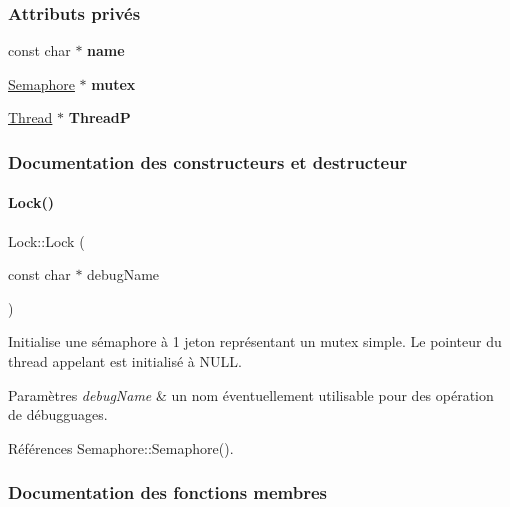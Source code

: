 \subsubsection*{Attributs privés}
\begin{DoxyCompactItemize}
\item 
\hypertarget{class_lock_a4fab518d5af485ba8c0a73e5467904dd}{}\label{class_lock_a4fab518d5af485ba8c0a73e5467904dd} 
const char $\ast$ {\bfseries name}
\item 
\hypertarget{class_lock_a2f6d199f9e3322259aa999aad60a4f54}{}\label{class_lock_a2f6d199f9e3322259aa999aad60a4f54} 
\hyperlink{class_semaphore}{Semaphore} $\ast$ {\bfseries mutex}
\item 
\hypertarget{class_lock_a44b08d70093bc63d221c25b3d3ac1d4a}{}\label{class_lock_a44b08d70093bc63d221c25b3d3ac1d4a} 
\hyperlink{class_thread}{Thread} $\ast$ {\bfseries ThreadP}
\end{DoxyCompactItemize}


\subsubsection{Documentation des constructeurs et destructeur}
\hypertarget{class_lock_afe45a309ecbd6b3346db887a76f0a9cf}{}\label{class_lock_afe45a309ecbd6b3346db887a76f0a9cf} 
\paragraph{\texorpdfstring{Lock()}{Lock()}}
{\footnotesize\ttfamily Lock\+::\+Lock (\begin{DoxyParamCaption}\item[{const char $\ast$}]{debug\+Name }\end{DoxyParamCaption})}



Initialise une sémaphore à 1 jeton représentant un mutex simple. Le pointeur du thread appelant est initialisé à N\+U\+LL. 


\begin{DoxyParams}{Paramètres}
{\em debug\+Name} & un nom éventuellement utilisable pour des opération de débugguages. \\
\hline
\end{DoxyParams}


Références Semaphore\+::\+Semaphore().



\subsubsection{Documentation des fonctions membres}
\hypertarget{class_lock_a35b68baf5f5a3165a4e6fe50845a46a2}{}\label{class_lock_a35b68baf5f5a3165a4e6fe50845a46a2} 
